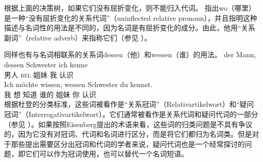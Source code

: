 \zl

根据上面的决策树，如果它们没有屈折变化，则不能归入代词。 \citet[]{Eisenberg2004a} 指出wo（哪里）是一种“没有屈折变化的关系代词”（uninflected relative pronoun），并且指明这种描述与名词性的用法是不同的，因为名词是有屈折变化的成分。由此，他用“关系副词”（relative adverb）来指称它们（参见 ）。

同样也有与名词相联系的关系词dessen（他）和wessen（谁）的用法。
\eal
\ex 
\gll der          Mann, dessen Schwester ich kenne\\
      男人  \textsc{rel} 姐妹 我 认识\\
\ex 
\gll Ich möchte wissen, wessen Schwester du kennst.\\
	 我 想 知道 谁的 姐妹 你 认识\\
\zl
根据杜登的分类标准，这些词被看作是“关系冠词”（Relativartikelwort）和“疑问冠词”（Interrogativartikelwort）。它们通常被看作是关系代词和疑问代词的一部分（参见 ）。如果按照Eisenberg提出的术语来看，这些词的归类问题是不具有争议的，因为它没有对冠词、代词和名词进行区分，而是将它们都归为名词类。但是对于那些提出需要区分出冠词和代词的学者来说，疑问代词也是一个经常探讨的问题，即它们可以作为冠词使用，也可以替代一个名词短语。

